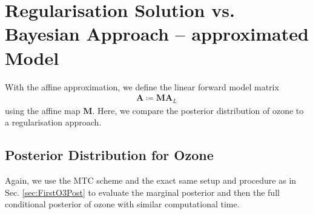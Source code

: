 \section{Regularisation Solution vs. Bayesian Approach -- approximated Model}
\label{sec:ComparReg}%
With the affine approximation, we define the linear forward model matrix
\begin{align}
	\bm{A}  \coloneqq \bm{M A}_L \,
\end{align}
using the affine map $\bm{M}$.
Here, we compare the posterior distribution of ozone to a regularisation approach.

\subsection{Posterior Distribution for Ozone}
Again, we use the MTC scheme and the exact same setup and procedure as in Sec. \ref{sec:FirstO3Post} to evaluate the marginal posterior and then the full conditional posterior of ozone with similar computational time.

